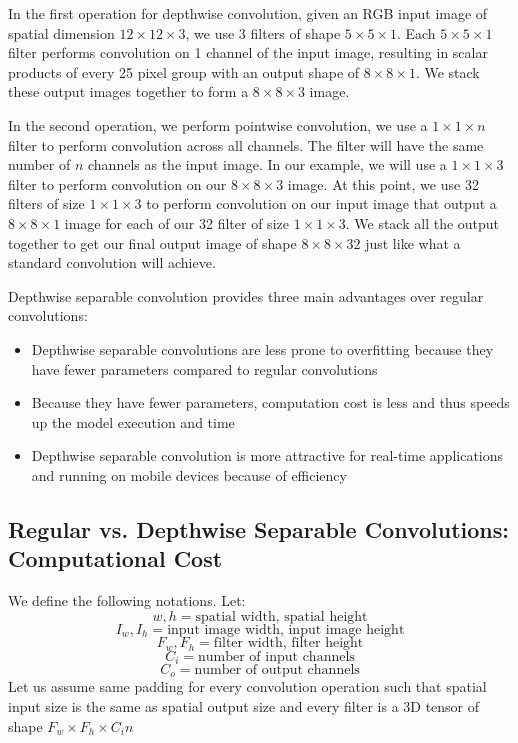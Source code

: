 \documentclass[master]{thesis-uestc}
\begin{document}
In the first operation for depthwise convolution, given an RGB input image of spatial dimension $12 \times 12 \times 3$, we use 3 filters of shape $5 \times 5\times 1$. Each $5 \times 5\times 1$ filter performs convolution on 1 channel of the input image, resulting in scalar products of every 25 pixel group with an output shape of $8\times8\times1$. We stack these output images together to form a $8\times8\times3$ image.

In the second operation, we perform pointwise convolution, we use a $1\times1\times n$ filter to perform convolution across all channels. The filter will have the same number of $n$ channels as the input image. In our example, we will use a $1\times1\times3$ filter to perform convolution on our $8\times8\times3$ image. At this point, we use 32 filters of size $1\times1\times3$ to perform convolution on our input image that output a $8\times8\times1$ image for each of our 32 filter of size $1\times1\times3$. We stack all the output together to get our final output image of shape $8\times8\times32$ just like what a standard convolution will achieve.

Depthwise separable convolution provides three main advantages over regular convolutions:
\begin{itemize}
    \item Depthwise separable convolutions are less prone to overfitting because they have fewer parameters compared to regular convolutions
    \item Because they have fewer parameters, computation cost is less and thus speeds up the model execution and time
    \item Depthwise separable convolution is more attractive for real-time applications and running on mobile devices because of efficiency
\end{itemize}

\subsection{Regular vs. Depthwise Separable Convolutions: Computational Cost}
We define the following notations. Let:
    \[w, h = \text{spatial width, spatial height}\]
    \[I_w, I_h = \text{input image width, input image height} \]
    \[F_w, F_h = \text{filter width, filter height}\]
    \[C_i = \text{number of input channels}\]
    \[C_o = \text{number of output channels}\]
Let us assume same padding for every convolution operation such that spatial input size is the same as spatial output size and every filter is a 3D tensor of shape $F_w \times F_h \times C_in$
\end{document}
